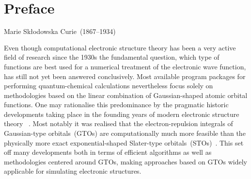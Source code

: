 \chapter{Preface}
{Marie Skłodowska Curie~(1867--1934)}


Even though computational electronic structure theory
has been a very active field of research since the 1930s
the fundamental question, which type of functions
are best used for a numerical treatment of the
electronic wave function, has still not yet been answered conclusively.
Most available program packages for performing
quantum-chemical calculations nevertheless focus
solely on methodologies based on
the linear combination of Gaussian-shaped atomic orbital functions.
One may rationalise this predominance
by the pragmatic historic developments
taking place in the founding years of modern electronic structure theory%
~\cite{Boys1950, Hehre1969}.
Most notably it was realised that the electron-repulsion integrals
of Gaussian-type orbitals~(GTOs) are computationally
much more feasible than the physically more exact
exponential-shaped Slater-type orbitals~(STOs)~\cite{Slater1930}.
This set off many developments
both in terms of efficient algorithms as well as methodologies
centered around GTOs,
making approaches based on GTOs widely applicable
for simulating electronic structures.

